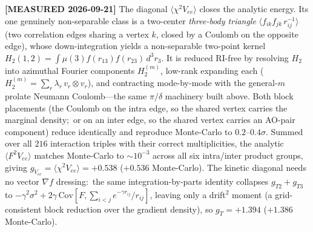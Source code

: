 \documentclass[aps,pra,twocolumn,superscriptaddress,longbibliography]{revtex4-2}
\begin{document}
\textbf{[MEASURED 2026-09-21]} The diagonal $\langle\chi^2 V_{ee}\rangle$ closes
the analytic energy.  Its one genuinely non-separable class is a two-center
\emph{three-body triangle} $\langle f_{i k}f_{j k}\,r_{ij}^{-1}\rangle$ (two
correlation edges sharing a vertex $k$, closed by a Coulomb on the opposite
edge), whose down-integration yields a non-separable two-point kernel
$H_2(1,2)=\int\mu(3)f(r_{13})f(r_{23})\,d^3r_3$.  It is reduced RI-free by
resolving $H_2$ into azimuthal Fourier components $H_2^{(m)}$, low-rank
expanding each ($H_2^{(m)}=\sum_r\lambda_r\,v_r\!\otimes\!v_r$), and contracting
mode-by-mode with the general-$m$ prolate Neumann Coulomb---the same $\pi/\delta$
machinery built above.  Both block placements (the Coulomb on the intra edge,
so the shared vertex carries the marginal density;\ or on an inter edge, so the
shared vertex carries an AO-pair component) reduce identically and reproduce
Monte-Carlo to $0.2$--$0.4\sigma$.  Summed over all $216$ interaction triples
with their correct multiplicities, the analytic $\langle F^2 V_{ee}\rangle$
matches Monte-Carlo to $\sim\!10^{-3}$ across all six intra/inter product
groups, giving $g_{V_{ee}}=\langle\chi^2 V_{ee}\rangle=+0.538$ ($+0.536$
Monte-Carlo).  The kinetic diagonal needs no vector $\nabla f$ dressing:\ the
same integration-by-parts identity collapses $g_{T2}+g_{T3}$ to
$-\gamma^2\sigma^2+2\gamma\,\mathrm{Cov}[F,\textstyle\sum_{i<j}e^{-\gamma r_{ij}}/r_{ij}]$,
leaving only a drift$^2$ moment (a grid-consistent block reduction over the
gradient density), so $g_T=+1.394$ ($+1.386$ Monte-Carlo).
\end{document}
